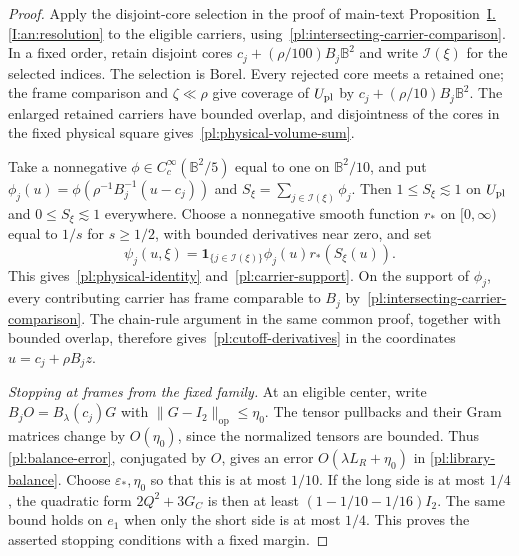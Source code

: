 \documentclass[11pt]{amsart}
\theoremstyle{definition}
\theoremstyle{remark}
\numberwithin{equation}{section}
\newcommand{\partIref}[1]{\hyperref[I:#1]{I.\ref*{I:#1}}}
\begin{document}
\begin{proof}
Apply the disjoint-core selection in the proof of main-text Proposition~\partIref{an:resolution} to the eligible carriers, using~\eqref{pl:intersecting-carrier-comparison}. In a fixed order, retain disjoint cores $c_j+(\rho/100)B_j\mathbb B^2$ and write $\mathcal I(\xi)$ for the selected indices. The selection is Borel. Every rejected core meets a retained one; the frame comparison and $\zeta\ll\rho$ give coverage of $U_{\rm pl}$ by $c_j+(\rho/10)B_j\mathbb B^2$. The enlarged retained carriers have bounded overlap, and disjointness of the cores in the fixed physical square gives~\eqref{pl:physical-volume-sum}.

Take a nonnegative $\phi\in C_c^\infty(\mathbb B^2/5)$ equal to one on $\mathbb B^2/10$, and put $\phi_j(u)=\phi(\rho^{-1}B_j^{-1}(u-c_j))$ and $S_\xi=\sum_{j\in\mathcal I(\xi)}\phi_j$. Then $1\le S_\xi\lesssim 1$ on $U_{\rm pl}$ and $0\le S_\xi\lesssim 1$ everywhere. Choose a nonnegative smooth function $r_*$ on $[0,\infty)$ equal to $1/s$ for $s\ge1/2$, with bounded derivatives near zero, and set
\begin{equation}\label{pl:actual-cutoff}
\psi_j(u,\xi)=\mathbf1_{\{j\in\mathcal I(\xi)\}}\phi_j(u)r_*(S_\xi(u)).
\end{equation}
This gives~\eqref{pl:physical-identity} and~\eqref{pl:carrier-support}. On the support of $\phi_j$, every contributing carrier has frame comparable to $B_j$ by~\eqref{pl:intersecting-carrier-comparison}. The chain-rule argument in the same common proof, together with bounded overlap, therefore gives~\eqref{pl:cutoff-derivatives} in the coordinates $u=c_j+\rho B_jz$.

\emph{Stopping at frames from the fixed family.} At an eligible center, write $B_jO=B_\lambda(c_j)G$ with $\|G-I_2\|_{\mathrm{op}}\le\eta_0$. The tensor pullbacks and their Gram matrices change by $O(\eta_0)$, since the normalized tensors are bounded. Thus \eqref{pl:balance-error}, conjugated by $O$, gives an error $O(\lambda L_R+\eta_0)$ in \eqref{pl:library-balance}. Choose $\varepsilon_*,\eta_0$ so that this is at most $1/10$. If the long side is at most $1/4$, the quadratic form $2Q^2+3G_C$ is then at least $(1-1/10-1/16)I_2$. The same bound holds on $e_1$ when only the short side is at most $1/4$. This proves the asserted stopping conditions with a fixed margin.
\end{proof}
\end{document}
